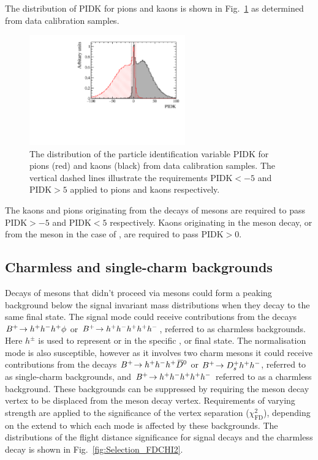 The distribution of PIDK for pions and kaons is shown in Fig.~\ref{fig:selection_PIDK_distribution} as determined from data calibration samples.
\begin{figure}[!h]
    \centering
        \includegraphics[width=0.6\textwidth]{figs/Selection/Calib_sample_PIDK.pdf}
        \caption{The distribution of the particle identification variable PIDK for pions (red) and kaons (black) from data calibration samples. The vertical dashed lines illustrate the requirements $\text{PIDK}<-5$ and $\text{PIDK}>5$ applied to pions and kaons respectively.}
    \label{fig:selection_PIDK_distribution}   
\end{figure}

The kaons and pions originating from the decays of \Dsp mesons are required to pass $\text{PIDK} > -5$ and $\text{PIDK} < 5$ respectively. Kaons originating in the \phiz meson decay, or from the \Bp meson in the case of \decay{\Bp}{\Dsp\Kp\Km}, are required to pass $\text{PIDK} > 0$. 



\subsection{Charmless and single-charm backgrounds}


Decays of \Bp mesons that didn't proceed via \D mesons could form a peaking background below the signal invariant mass distributions when they decay to the same final state.
The signal mode could receive contributions from the decays ${{{B}^+}}\!\rightarrow h^{+}h^{-}h^{+}\phi$ or ${{{B}^+}}\!\rightarrow h^{+}h^{-}h^{+}h^{+}h^{-}$, referred to as charmless backgrounds. Here $h^{\pm}$ is used to represent \Kpm or \pipm in the specific \Dsp, \Dzb or \phiz final state.
The normalisation mode is also susceptible, however as it involves two charm mesons it could receive contributions from the decays ${{{B}^+}}\!\rightarrow h^{+}h^{-}h^{+}{{\kern 0.2em\overline{\kern -0.2em D}{}}{}^0}$ or ${{{B}^+}}\!\rightarrow {\ensuremath{{D}^+_{s}}} h^{+}h^{-}$, referred to as single-charm backgrounds, and ${{{B}^+}}\!\rightarrow h^{+}h^{-}h^{+} h^{+}h^{-}$ referred to as a charmless background.
These backgrounds can be suppressed by requiring the \D meson decay vertex to be displaced from the \Bp meson decay vertex. Requirements of varying strength are applied to the significance of the vertex separation ($\chi^{2}_{\text{FD}}$), depending on the extend to which each mode is affected by these backgrounds. The distributions of the flight distance significance for \decay{\Bp}{(\decay{\Dsp}{\Kp\pim\pip})\phiz} signal decays and the charmless \decay{\Bp}{\Kp\pim\pip\phiz} decay is shown in Fig.~\ref{fig:Selection_FDCHI2}.

